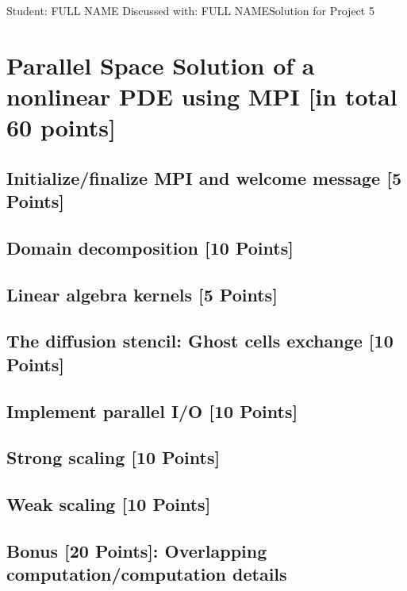 \documentclass[unicode,11pt,a4paper,oneside,numbers=endperiod,openany]{scrartcl}
\begin{document}
\setassignment
{}

            {Student: FULL NAME}
            {Discussed with: FULL NAME}{Solution for Project 5}{}
\newline

\assignmentpolicy

\section{Parallel Space Solution of a nonlinear PDE using MPI
         [in total 60 points]}

\subsection{Initialize/finalize MPI and welcome message [5 Points]}

\subsection{Domain decomposition [10 Points]}

\subsection{Linear algebra kernels [5 Points]}

\subsection{The diffusion stencil: Ghost cells exchange [10 Points]}

\subsection{Implement parallel I/O [10 Points]}

\subsection{Strong scaling [10 Points]}

\subsection{Weak scaling [10 Points]}

\subsection{Bonus [20 Points]: Overlapping computation/computation details}
\end{document}
